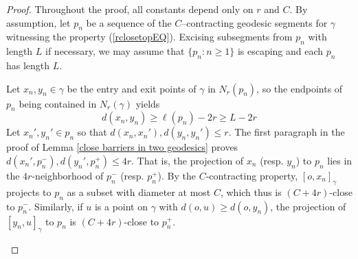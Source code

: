 \documentclass{amsart}
\theoremstyle{definition}
\theoremstyle{remark}
\begin{document}
\begin{proof}
Throughout the proof, all constants depend only on $r$ and $C$. 
By assumption, let  $p_n$ be a sequence of the $C$--contracting geodesic segments  for $\gamma$ witnessing the property (\ref{rclosetopEQ}). Excising subsegments from $p_n$ with length $L$ if necessary, we may assume that $\{p_n: n\ge 1\}$ is    escaping and each $p_n$ has length  $L$. 

Let $x_n,y_n\in \gamma$ be the entry and exit points of $\gamma$ in $N_r(p_n)$, so the endpoints of $p_n$ being contained in $N_r(\gamma)$ yields $$d(x_n,y_n)\ge \ell(p_n)-2r\ge L-2r$$ Let $x_n', y_n'\in p_n$ so that $d(x_n,x_n'),d(y_n,y_n')\le r$. The first paragraph in the proof of Lemma \ref{close barriers in two geodesics} proves $d(x_n',p_n^-),d(y_n',p_n^+)\le 4r$. That is, the projection of  $x_n$ (resp. $y_n$) to $p_n$ lies in the $4r$-neighborhood of $p_n^-$ (resp. $p_n^+$). By the $C$-contracting property, $[o,x_n]_\gamma$ projects to $p_n$  as a subset with diameter at most $C$, which thus is  $(C+4r)$-close to $p_n^-$. Similarly, if $u$ is a point  on $\gamma$ with $d(o,u)\ge d(o,y_n)$, the projection of $[y_n,u]_\gamma$ to $p_n$ is $(C+4r)$-close to $p_n^+$. 

\begin{figure}
    \centering



\begin{tikzpicture}[x=0.75pt,y=0.75pt,yscale=-1,xscale=1]


\end{tikzpicture}
\end{figure}
\end{proof}
\end{document}
